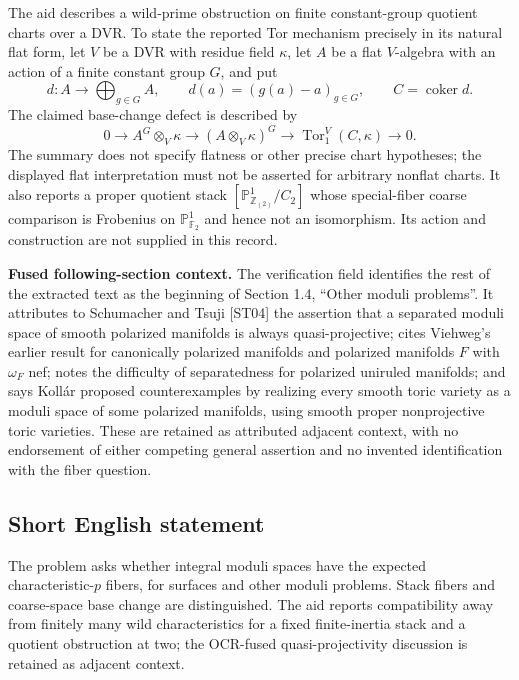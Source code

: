 \documentclass[11pt]{article}
\newcommand{\Z}{\mathbb{Z}}
\newcommand{\F}{\mathbb{F}}
\newcommand{\PP}{\mathbb{P}}
\begin{document}
The aid describes a wild-prime obstruction on finite constant-group quotient charts over a DVR. To state the reported Tor mechanism precisely in its natural flat form, let $V$ be a DVR with residue field $\kappa$, let $A$ be a flat $V$-algebra with an action of a finite constant group $G$, and put
\[d:A\longrightarrow\bigoplus_{g\in G}A,\qquad d(a)=(g(a)-a)_{g\in G},\qquad C=\operatorname{coker}d.\]
The claimed base-change defect is described by
\[0\longrightarrow A^G\otimes_V\kappa\longrightarrow(A\otimes_V\kappa)^G\longrightarrow\operatorname{Tor}_1^V(C,\kappa)\longrightarrow0.\]
The summary does not specify flatness or other precise chart hypotheses; the displayed flat interpretation must not be asserted for arbitrary nonflat charts. It also reports a proper quotient stack $[\PP^1_{\Z_{(2)}}/C_2]$ whose special-fiber coarse comparison is Frobenius on $\PP^1_{\F_2}$ and hence not an isomorphism. Its action and construction are not supplied in this record.

\textbf{Fused following-section context.} The verification field identifies the rest of the extracted text as the beginning of Section 1.4, ``Other moduli problems''. It attributes to Schumacher and Tsuji [ST04] the assertion that a separated moduli space of smooth polarized manifolds is always quasi-projective; cites Viehweg's earlier result for canonically polarized manifolds and polarized manifolds $F$ with $\omega_F$ nef; notes the difficulty of separatedness for polarized uniruled manifolds; and says Kollár proposed counterexamples by realizing every smooth toric variety as a moduli space of some polarized manifolds, using smooth proper nonprojective toric varieties. These are retained as attributed adjacent context, with no endorsement of either competing general assertion and no invented identification with the fiber question.
\subsection{Short English statement}
The problem asks whether integral moduli spaces have the expected characteristic-$p$ fibers, for surfaces and other moduli problems. Stack fibers and coarse-space base change are distinguished. The aid reports compatibility away from finitely many wild characteristics for a fixed finite-inertia stack and a quotient obstruction at two; the OCR-fused quasi-projectivity discussion is retained as adjacent context.
\end{document}
